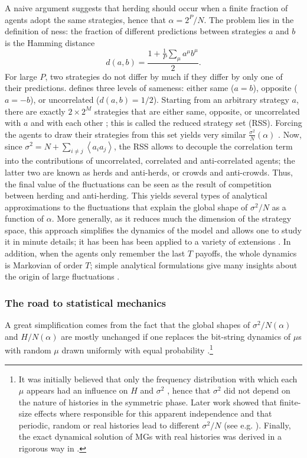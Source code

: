\documentclass[aps,twocolumn,nofootinbib,sortedaddress,reprint]{revtex4-1}
\begin{document}
A naive argument suggests that herding should occur when a finite
fraction of agents adopt the same strategies, hence that $\alpha=2^
P/N$. The problem lies in the definition of ness: the fraction of
different predictions between strategies $a$ and $b$ is the Hamming
distance
\begin{equation}
d(a,b)=\frac{1+\frac{1}{P}\sum_\mu a^\mu b^\mu}{2}.
\end{equation}
For large $P$, two strategies do not differ by much if they differ by only
one of their predictions. \textcite{ZENews} defines three levels of
sameness: either same ($a=b$), opposite ($a=-b$), or uncorrelated
($d(a,b)=1/2$). Starting from an arbitrary strategy $a$, there are
exactly $2\times 2^M$ strategies that are either same, opposite, or
uncorrelated with $a$ and with each other \cite{CZ98}; this is called
the reduced strategy set (RSS). Forcing the agents to draw their
strategies from this set yields very similar
$\frac{\sigma^2}{N}(\alpha)$ \cite{CZ98}. Now, since
$\sigma^2=N+\sum_{i\ne j}\left<a_ia_j\right>$, the RSS allows to
decouple the correlation term into the contributions of uncorrelated,
correlated and anti-correlated agents; the latter two are known as
herds and anti-herds, or crowds and anti-crowds. Thus, the final value
of the fluctuations can be seen as the result of competition between
herding and anti-herding. This yields several types of analytical
approximations to the fluctuations that explain the global shape of
$\sigma^2/N$ as a function of $\alpha$. More generally, as it reduces
much the dimension of the strategy space, this approach simplifies the
dynamics of the model and allows one to study it in minute details; it
has been has been applied to a variety of extensions
\cite{JohnsonCrowds,JohnsonDeterministic,JohnsonCrowdsTheory,choe2004errordriventransition}.
In addition, when the agents only remember the last $T$ payoffs,
the whole dynamics is Markovian of order $T$; simple analytical formulations give many
insights about the origin of large fluctuations \cite{JohnsonHorizon,satinover2008cycles}.

\subsubsection{The road to statistical mechanics}

A great simplification comes from the fact
that the global shapes of $\sigma^2/N(\alpha)$ and $H/N(\alpha)$ are
mostly unchanged if one replaces the bit-string dynamics of $\mu$s
with random $\mu$ drawn uniformly with equal probability  \cite{Cavagna}.\footnote{It
  was initially believed that only the frequency distribution with
  which each $\mu$ appears had an influence on $H$ and $\sigma^2$
  \cite{CM00}, hence that $\sigma^2$ did not depend on the nature of
  histories in the symmetric phase. Later work showed that finite-size
  effects where responsible for this apparent independence and that
  periodic, random or real histories lead to different $\sigma^2/N$
  (see e.g. \textcite{hung2007effective}). Finally, the exact
  dynamical solution of MGs with real histories was derived in a
  rigorous way in \textcite{CoolenRealHistories}.}
\end{document}
